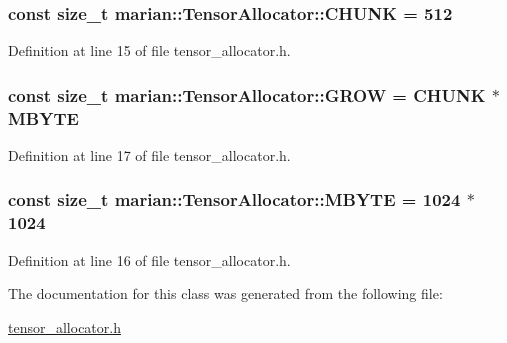 \subsubsection[{\texorpdfstring{C\+H\+U\+NK}{CHUNK}}]{\setlength{\rightskip}{0pt plus 5cm}const size\+\_\+t marian\+::\+Tensor\+Allocator\+::\+C\+H\+U\+NK = 512\hspace{0.3cm}{\ttfamily [private]}}\hypertarget{classmarian_1_1TensorAllocator_ab627424d8f12314027f9426751e5f234}{}\label{classmarian_1_1TensorAllocator_ab627424d8f12314027f9426751e5f234}


Definition at line 15 of file tensor\+\_\+allocator.\+h.

\subsubsection[{\texorpdfstring{G\+R\+OW}{GROW}}]{\setlength{\rightskip}{0pt plus 5cm}const size\+\_\+t marian\+::\+Tensor\+Allocator\+::\+G\+R\+OW = {\bf C\+H\+U\+NK} $\ast$ {\bf M\+B\+Y\+TE}\hspace{0.3cm}{\ttfamily [private]}}\hypertarget{classmarian_1_1TensorAllocator_a2418478a88da484f84a529bd037653dd}{}\label{classmarian_1_1TensorAllocator_a2418478a88da484f84a529bd037653dd}


Definition at line 17 of file tensor\+\_\+allocator.\+h.

\subsubsection[{\texorpdfstring{M\+B\+Y\+TE}{MBYTE}}]{\setlength{\rightskip}{0pt plus 5cm}const size\+\_\+t marian\+::\+Tensor\+Allocator\+::\+M\+B\+Y\+TE = 1024 $\ast$ 1024\hspace{0.3cm}{\ttfamily [private]}}\hypertarget{classmarian_1_1TensorAllocator_a0cb98da32ded7b9adc5d2ad6a5155541}{}\label{classmarian_1_1TensorAllocator_a0cb98da32ded7b9adc5d2ad6a5155541}


Definition at line 16 of file tensor\+\_\+allocator.\+h.



The documentation for this class was generated from the following file\+:\begin{DoxyCompactItemize}
\item 
\hyperlink{tensor__allocator_8h}{tensor\+\_\+allocator.\+h}\end{DoxyCompactItemize}

